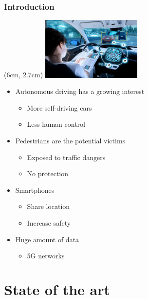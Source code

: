 \documentclass{beamer}
\begin{document}
\begin{frame}
    \frametitle{Introduction}
    \begin{textblock*}{5cm}(6cm, 2.7cm) %
        \includegraphics[width=5cm]{pics/Woman reading.png}
    \end{textblock*}
    \begin{itemize}
        \item Autonomous driving has a growing interest
              \begin{itemize}
                  \item More self-driving cars
                  \item Less human control
              \end{itemize}
        \item Pedestrians are the potential victims
              \begin{itemize}
                  \item Exposed to traffic dangers
                  \item No protection
              \end{itemize}
        \item Smartphones
              \begin{itemize}
                  \item Share location
                  \item Increase safety
              \end{itemize}
        \item Huge amount of data
              \begin{itemize}
                  \item 5G networks
              \end{itemize}
    \end{itemize}
\end{frame}

\section{State of the art}
\end{document}
